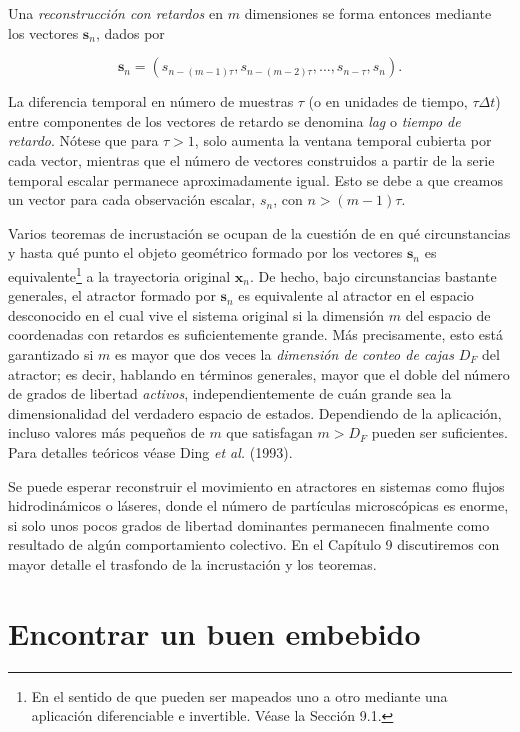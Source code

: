 \documentclass[10pt,a4paper]{book}
\begin{document}
Una \textit{reconstrucción con retardos} en $m$ dimensiones se forma entonces mediante los vectores $\mathbf{s}_n$, dados por

\begin{equation}
\mathbf{s}_n = (s_{n-(m-1)\tau}, s_{n-(m-2)\tau}, \ldots, s_{n-\tau}, s_n) .
\end{equation}

La diferencia temporal en número de muestras $\tau$ (o en unidades de tiempo, $\tau \Delta t$) entre componentes de los vectores de retardo se denomina \textit{lag} o \textit{tiempo de retardo}. Nótese que para $\tau > 1$, solo aumenta la ventana temporal cubierta por cada vector, mientras que el número de vectores construidos a partir de la serie temporal escalar permanece aproximadamente igual. Esto se debe a que creamos un vector para cada observación escalar, $s_n$, con $n > (m-1)\tau$.

Varios teoremas de incrustación se ocupan de la cuestión de en qué circunstancias y hasta qué punto el objeto geométrico formado por los vectores $\mathbf{s}_n$ es equivalente\footnote{En el sentido de que pueden ser mapeados uno a otro mediante una aplicación diferenciable e invertible. Véase la Sección 9.1.} a la trayectoria original $\mathbf{x}_n$. De hecho, bajo circunstancias bastante generales, el atractor formado por $\mathbf{s}_n$ es equivalente al atractor en el espacio desconocido en el cual vive el sistema original si la dimensión $m$ del espacio de coordenadas con retardos es suficientemente grande. Más precisamente, esto está garantizado si $m$ es mayor que dos veces la \textit{dimensión de conteo de cajas} $D_F$ del atractor; es decir, hablando en términos generales, mayor que el doble del número de grados de libertad \textit{activos}, independientemente de cuán grande sea la dimensionalidad del verdadero espacio de estados. Dependiendo de la aplicación, incluso valores más pequeños de $m$ que satisfagan $m > D_F$ pueden ser suficientes. Para detalles teóricos véase Ding \textit{et al.} (1993).

Se puede esperar reconstruir el movimiento en atractores en sistemas como flujos hidrodinámicos o láseres, donde el número de partículas microscópicas es enorme, si solo unos pocos grados de libertad dominantes permanecen finalmente como resultado de algún comportamiento colectivo. En el Capítulo 9 discutiremos con mayor detalle el trasfondo de la incrustación y los teoremas.

\newpage

\section{Encontrar un buen embebido}
\end{document}
